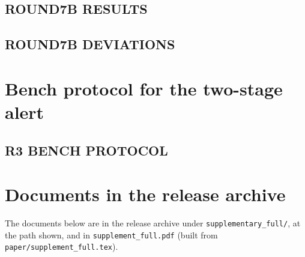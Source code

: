 \documentclass[10pt,a4paper]{article}
\begin{document}
\subsection{ROUND7B RESULTS}


\subsection{ROUND7B DEVIATIONS}


\section{Bench protocol for the two-stage alert}

\subsection{R3 BENCH PROTOCOL}

\section{Documents in the release archive}
The documents below are in the release archive under \texttt{supplementary\_full/}, at the path shown, and in \texttt{supplement\_full.pdf} (built from \texttt{paper/supplement\_full.tex}).
\end{document}

